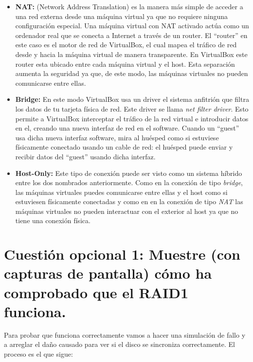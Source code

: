 \documentclass[a4paper,titlepage,12pt]{scrartcl}	%
\numberwithin{figure}{section} %
\numberwithin{table}{section} %
\begin{document}
	\begin{itemize}
		\item \textbf{NAT: } (Network Address Translation) es la manera más simple de acceder a una red externa desde una máquina virtual ya que no requiere ninguna configuración especial. Una máquina virtual con NAT activado actúa como un ordenador real que se conecta a Internet a través de un router. El ``router'' en este caso es el motor de red de VirtualBox, el cual mapea el tráfico de red desde y hacia la máquina virtual de manera transparente. En VirtualBox este router esta ubicado entre cada máquina virtual y el host. Esta separación aumenta la seguridad ya que, de este modo, las máquinas virtuales no pueden comunicarse entre ellas.
		\item \textbf{Bridge: } En este modo VirtualBox usa un driver el sistema anfitrión que filtra los datos de tu tarjeta física de red. Este driver se llama \textit{net filter driver}. Esto permite a VirtualBox interceptar el tráfico de la red virtual e introducir datos en el, creando una nueva interfaz de red en el software. Cuando un ``guest'' usa dicha nueva interfaz software, mira al huésped como si estuviese físicamente conectado usando un cable de red: el huésped puede enviar y recibir datos del ``guest'' usando dicha interfaz.				
		\item \textbf{Host-Only: } Este tipo de conexión puede ser visto como un sistema híbrido entre los dos nombrados anteriormente. Como en la conexión de tipo \textit{bridge}, las máquinas virtuales puedes comunicarse entre ellas y el host como si estuviesen físicamente conectadas y como en en la conexión de tipo \textit{NAT} las máquinas virtuales no pueden interactuar con el exterior al host ya que no tiene una conexión física.
	\end{itemize}
	
	\clearpage
	
	\section[Cuestión opcional 1: Muestre (con capturas de pantalla) cómo ha comprobado que el RAID1 funciona.]{Cuestión opcional 1: Muestre (con capturas de pantalla) cómo ha comprobado que el RAID1 funciona.}
	
	Para probar que funciona correctamente vamos a hacer una simulación de fallo y a arreglar el daño causado para ver si el disco se sincroniza correctamente. El proceso es el que sigue: \cite{comprobarRAID} \\
	
\end{document}
